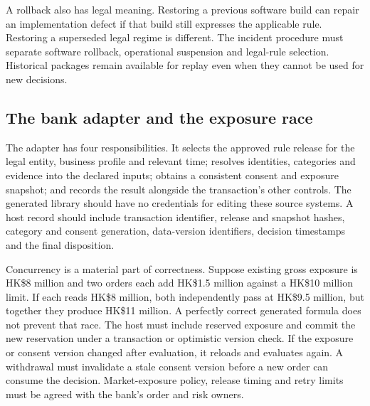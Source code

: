 \documentclass[12pt,a4paper,oneside,openany]{book}
\begin{document}
A rollback also has legal meaning. Restoring a previous software build can repair
an implementation defect if that build still expresses the applicable rule.
Restoring a superseded legal regime is different. The incident procedure must
separate software rollback, operational suspension and legal-rule selection.
Historical packages remain available for replay even when they cannot be used for
new decisions.

\subsection{The bank adapter and the exposure race}
\label{merge:P-03d-java-delivery:05}


The adapter has four responsibilities. It selects the approved rule release for
the legal entity, business profile and relevant time; resolves identities,
categories and evidence into the declared inputs; obtains a consistent consent
and exposure snapshot; and records the result alongside the transaction's other
controls. The generated library should have no credentials for editing these
source systems. A host record should include transaction identifier, release and
snapshot hashes, category and consent generation, data-version identifiers,
decision timestamps and the final disposition.

Concurrency is a material part of correctness. Suppose existing gross exposure
is HK\$8 million and two orders each add HK\$1.5 million against a HK\$10 million
limit. If each reads HK\$8 million, both independently pass at HK\$9.5 million,
but together they produce HK\$11 million. A perfectly correct generated formula
does not prevent that race. The host must include reserved exposure and commit
the new reservation under a transaction or optimistic version check. If the
exposure or consent version changed after evaluation, it reloads and evaluates
again. A withdrawal must invalidate a stale consent version before a new order
can consume the decision. Market-exposure policy, release timing and retry limits
must be agreed with the bank's order and risk owners.
\end{document}
